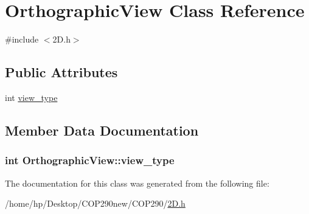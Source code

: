 \hypertarget{class_orthographic_view}{}\section{Orthographic\+View Class Reference}
\label{class_orthographic_view}


{\ttfamily \#include $<$2\+D.\+h$>$}

\subsection*{Public Attributes}
\begin{DoxyCompactItemize}
\item 
int \hyperlink{class_orthographic_view_ae9f5b34d51d46495fd507dfa8f0c352b}{view\+\_\+type}
\end{DoxyCompactItemize}


\subsection{Member Data Documentation}
\subsubsection[{\texorpdfstring{view\+\_\+type}{view_type}}]{\setlength{\rightskip}{0pt plus 5cm}int Orthographic\+View\+::view\+\_\+type}\hypertarget{class_orthographic_view_ae9f5b34d51d46495fd507dfa8f0c352b}{}\label{class_orthographic_view_ae9f5b34d51d46495fd507dfa8f0c352b}


The documentation for this class was generated from the following file\+:\begin{DoxyCompactItemize}
\item 
/home/hp/\+Desktop/\+C\+O\+P290new/\+C\+O\+P290/\hyperlink{2_d_8h}{2\+D.\+h}\end{DoxyCompactItemize}
